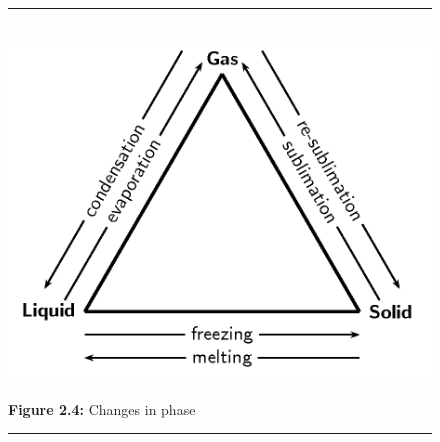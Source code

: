 	\begin{figure}[H] %
    \begin{center}
    \rule[.1in]{\figurerulewidth}{.005in} \\
        \label{m38730*uid42!!!underscore!!!media}\label{m38730*uid42!!!underscore!!!printimage}\includegraphics{col11305.imgs/m38730_CG10C2_009.png} %
      \vspace{2pt}
    \vspace{\rubberspace}\par \begin{cnxcaption}
	  \small \textbf{Figure 2.4: }Changes in phase
	\end{cnxcaption}
    \vspace{.1in}
    \rule[.1in]{\figurerulewidth}{.005in} \\
    \end{center}
 \end{figure}       
\label{m38730*cid7}
